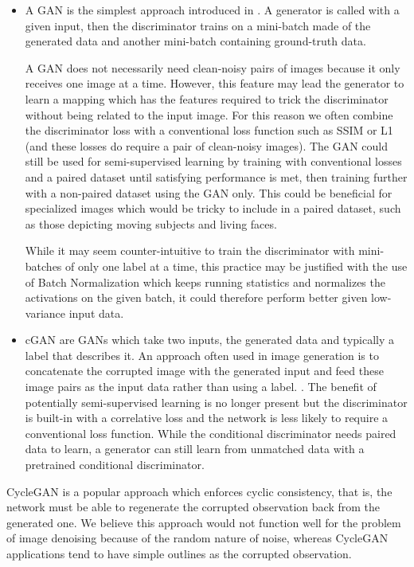 \begin{itemize}
  \item A \ac{GAN} is the simplest approach introduced in \cite{gan}. A generator is called with a given input, then the discriminator trains on a mini-batch made of the generated data and another mini-batch containing ground-truth data.

A \ac{GAN} does not necessarily need clean-noisy pairs of images because it only receives one image at a time. However, this feature may lead the generator to learn a mapping which has the features required to trick the discriminator without being related to the input image. For this reason we often combine the discriminator loss with a conventional loss function such as SSIM or L1 (and these losses do require a pair of clean-noisy images). The GAN could still be used for semi-supervised learning by training with conventional losses and a paired dataset until satisfying performance is met, then training further with a non-paired dataset using the GAN only. This could be beneficial for specialized images which would be tricky to include in a paired dataset, such as those depicting moving subjects and living faces.

While it may seem counter-intuitive to train the discriminator with mini-batches of only one label at a time, this practice may be justified with the use of Batch Normalization which keeps running statistics and normalizes the activations on the given batch, it could therefore perform better given low-variance input data. \cite{gantechniques}\cite{bn} %
  \item \ac{cGAN} are \acsp{GAN} which take two inputs, the generated data and typically a label that describes it. An approach often used in image generation is to concatenate the corrupted image with the generated input and feed these image pairs as the input data rather than using a label. \cite{pix2pix}\cite{cyclegan}\cite{pix2pixhd}. The benefit of potentially semi-supervised learning is no longer present but the discriminator is built-in with a correlative loss and the network is less likely to require a conventional loss function. While the conditional discriminator needs paired data to learn, a generator can still learn from unmatched data with a pretrained conditional discriminator.
\end{itemize}
CycleGAN\cite{cyclegan} is a popular approach which enforces cyclic consistency, that is, the network must be able to regenerate the corrupted observation back from the generated one. We believe this approach would not function well for the problem of image denoising because of the random nature of noise, whereas CycleGAN applications tend to have simple outlines as the corrupted observation.

